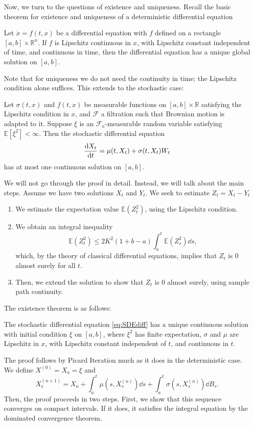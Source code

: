 \documentclass[prb,12pt]{revtex4-2}
\theoremstyle{definition}
\theoremstyle{definition}
\theoremstyle{definition}
\newcommand{\R}{\mathbb{R}}
\begin{document}
Now, we turn to the questions of existence and uniqueness. Recall the basic theorem for existence and uniqueness of a deterministic differential equation
\begin{Theorem}
	Let $\dot{x} = f(t,x)$ be a differential equation with $f$ defined on a rectangle $[a,b]\times \R^n$. If $f$ is Lipschitz continuous in $x$, with Lipschitz constant independent of time, and continuous in time, then the differential equation has a unique global solution on $[a,b]$.
\end{Theorem}
Note that for uniqueness we do not need the continuity in time; the Lipschitz condition alone suffices. This extends to the stochastic case:
\begin{Theorem}
	Let $\sigma(t,x)$ and $f(t,x)$ be measurable functions on $[a,b]\times \R$ satisfying the Lipschitz condition in $x$, and $\mathcal{F}$ a filtration such that Brownian motion is adapted to it. Suppose $\xi$ is an $\mathcal{F}_a$-measurable random variable satisfying $\mathbb{E}[\xi^2]<\infty$. Then the stochastic differential equation
	\[\dv{X_t}{t}=\mu(t, X_t)+\sigma(t, X_t)W_t\]
	has at most one continuous solution on $[a,b]$.
\end{Theorem}
	We will not go through the proof in detail. Instead, we will talk about the main steps. Assume we have two solutions $X_t$ and $Y_t$. We seek to estimate $Z_t=X_t-Y_t$
	\begin{enumerate}
		\item We estimate the expectation value $\mathbb{E}(Z_t^2)$, using the Lipschitz condition.
		\item We obtain an integral inequality
			 \[
			 \mathbb{E}(Z_t^2) \le 2K^2 (1+b-a)\int_a^t \mathbb{E}(Z_s^2)\dd{s}
			,\]
			which, by the theory of classical differential equations, implies that $Z_t$ is 0 almost surely for all $t$.
		\item Then, we extend the solution to show that $Z_t$ is $0$ almost surely, using sample path continuity.
	\end{enumerate}
The existence theorem is as follows:
\begin{Theorem}
	The stochastic differential equation \eqref{eq:SDEdiff} has a unique continuous solution with initial condition $\xi$ on $[a,b]$, where $\xi^2$ has finite expectation, $\sigma$ and $\mu$ are Lipschitz in $x$, with Lipschitz constant independent of $t$, and continuous in $t$.
\end{Theorem}
	The proof follows by Picard Iteration much as it does in the deterministic case. We define $X^{(0)}=X_a=\xi$ and
	\[
	X_t^{(n+1)}=X_a+\int_a^t \mu(s, X_s^{(n)})\dd{s}+\int_a^t \sigma(s, X_s^{(n)})\dd{B_s}
	.\] 
	Then, the proof proceeds in two steps. First, we show that this sequence converges on compact intervals. If it does, it satisfies the integral equation by the dominated convergence theorem. 
	
\end{document}
